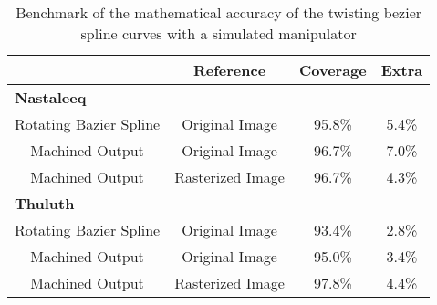     \begin{table}
    \begin{center}
    \caption{Benchmark of the mathematical accuracy of the twisting bezier spline curves with a simulated manipulator}
    \label{Table:MachineDataMetrices}
    \begin{tabular}{| c | c | c | c |}
    \hline
      & \textbf{Reference} & \textbf{Coverage} & \textbf{Extra} \\
      \hline
      \multicolumn{4}{|l|}{\textbf{Nastaleeq}}\\
      \hline
      Rotating Bazier Spline & Original Image & 95.8\% & 5.4\% \\
      \hline
      Machined Output & Original Image & 96.7\% & 7.0\% \\
      \hline
      Machined Output & Rasterized Image & 96.7\% & 4.3\% \\
      \hline
      \multicolumn{4}{|l|}{\textbf{Thuluth}}\\
      \hline
      Rotating Bazier Spline & Original Image & 93.4\% & 2.8\% \\
      \hline
      Machined Output & Original Image & 95.0\% & 3.4\% \\
      \hline
      Machined Output & Rasterized Image & 97.8\% & 4.4\% \\
    \hline
    \end{tabular}
    \end{center}
    \end{table}